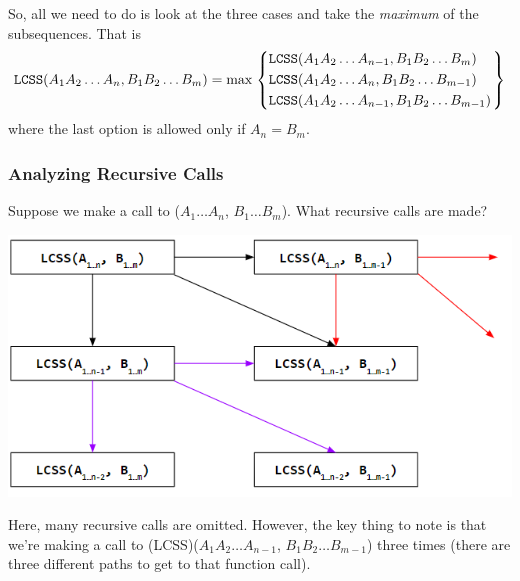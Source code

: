 \documentclass[letterpaper]{article}
\begin{document}
\bigskip 

So, all we need to do is look at the three cases and take the \emph{maximum} of the subsequences. That is
\[\texttt{LCSS}(A_1 A_2 \dots A_n, B_1 B_2 \dots B_m) = \max \begin{rcases}
    \begin{dcases}
        \texttt{LCSS}(A_1 A_2 \dots A_{n - 1}, B_1 B_2 \dots B_m) \\ 
        \texttt{LCSS}(A_1 A_2 \dots A_n, B_1 B_2 \dots B_{m - 1}) \\ 
        \texttt{LCSS}(A_1 A_2 \dots A_{n - 1}, B_1 B_2 \dots B_{m - 1})
    \end{dcases}
\end{rcases}\]
where the last option is allowed only if $A_n = B_m$. 

\subsubsection{Analyzing Recursive Calls}
Suppose we make a call to ($A_1 \dots A_n$, $B_1 \dots B_m$). What recursive calls are made? 
\begin{center}
    \includegraphics[scale=0.9]{../assets/lcss_1.png}
\end{center}
Here, many recursive calls are omitted. However, the key thing to note is that we're making a call to \code(LCSS)($A_1 A_2 \dots A_{n - 1}$, $B_1 B_2 \dots B_{m - 1}$) three times (there are three different paths to get to that function call). 
\end{document}
